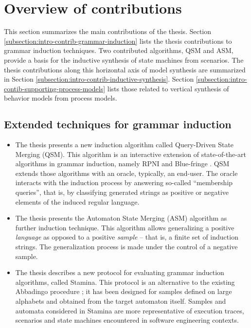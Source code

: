 \section{Overview of contributions\label{section:intro-contributions}}

This section summarizes the main contributions of the thesis. Section \ref{subsection:intro-contrib-grammar-induction} lists the thesis contributions to grammar induction techniques. Two contributed algorithms, QSM and ASM, provide a basis for the inductive synthesis of state machines from scenarios. The thesis contributions along this horizontal axis of model synthesis are summarized in Section \ref{subsection:intro-contrib-inductive-synthesis}. Section \ref{subsection:intro-contib-supporting-process-models} lists those related to vertical synthesis of behavior models from process models.


\subsection{Extended techniques for grammar induction\label{subsection:intro-contrib-grammar-induction}}

\begin{itemize}
\item The thesis presents a new induction algorithm called Query-Driven State Merging (QSM). This algorithm is an interactive extension of state-of-the-art algorithms in grammar induction, namely RPNI and Blue-fringe \cite{Oncina:1992, Lang:1998}. QSM extends those algorithms with an oracle, typically, an end-user. The oracle interacts with the induction process by answering so-called ``membership queries'', that is, by classifying generated strings as positive or negative elements of the induced regular language.
\item The thesis presents the Automaton State Merging (ASM) algorithm as further induction technique. This algorithm allows generalizing a positive \emph{language} as opposed to a positive \emph{sample} -- that is, a finite set of induction strings. The generalization process is made under the control of a negative sample.
\item The thesis describes a new protocol for evaluating grammar induction algorithms, called Stamina. This protocol is an alternative to the existing Abbadingo procedure \cite{Lang:1998}; it has been designed for samples defined on large alphabets and obtained from the target automaton itself. Samples and automata considered in Stamina are more representative of execution traces, scenarios and state machines encountered in software engineering contexts.
\end{itemize}


